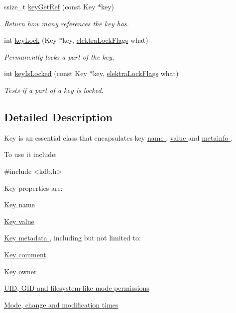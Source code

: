 \begin{DoxyCompactItemize}
ssize\+\_\+t \hyperlink{group__key_ga4aabc4272506dd63161db2bbb42de8ae}{key\+Get\+Ref} (const Key $\ast$key)
\begin{DoxyCompactList}\small\item\em Return how many references the key has. \end{DoxyCompactList}\item 
int \hyperlink{group__key_ga5e42b653a0f117be7f1f6eb06c569bb8}{key\+Lock} (Key $\ast$key, \hyperlink{group__key_gafa3306030b1d06b06c3cba24c516f5ec}{elektra\+Lock\+Flags} what)
\begin{DoxyCompactList}\small\item\em Permanently locks a part of the key. \end{DoxyCompactList}\item 
int \hyperlink{group__key_ga769882e86e34a95cefcf8f260ef97e06}{key\+Is\+Locked} (const Key $\ast$key, \hyperlink{group__key_gafa3306030b1d06b06c3cba24c516f5ec}{elektra\+Lock\+Flags} what)
\begin{DoxyCompactList}\small\item\em Tests if a part of a key is locked. \end{DoxyCompactList}\end{DoxyCompactItemize}


\subsection{Detailed Description}
Key is an essential class that encapsulates key \hyperlink{group__keyname}{name }, \hyperlink{group__keyvalue}{value } and \hyperlink{group__keymeta}{metainfo }. 

To use it include\+: 
\begin{DoxyCode}
\textcolor{preprocessor}{#include <kdb.h>}
\end{DoxyCode}


Key properties are\+:
\begin{DoxyItemize}
\item \hyperlink{group__keyname}{Key name }
\item \hyperlink{group__keyvalue}{Key value }
\item \hyperlink{group__keymeta}{Key metadata }, including but not limited to\+:
\begin{DoxyItemize}
\item \hyperlink{group__meta_gafb89735689929ff717cc9f2d0d0b46a2}{Key comment }
\item \hyperlink{owner_8c_a35922a017bee8b4bcb493bbdfad9d6f5}{Key owner }
\item \hyperlink{group__keymeta}{U\+ID, G\+ID and filesystem-\/like mode permissions }
\item \hyperlink{group__keymeta}{Mode, change and modification times }
\end{DoxyItemize}
\end{DoxyItemize}

